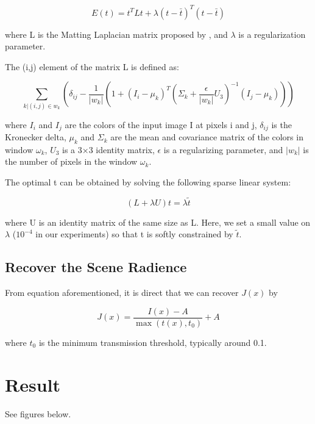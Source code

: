 \documentclass{article}
\begin{document}
        $$E(t) = t^{T} L t + \lambda (t - \bar{t})^{T} (t - \bar{t})$$

        where L is the Matting Laplacian matrix proposed by \cite{Anat}, and $\lambda$ is a regularization parameter.

        The (i,j) element of the matrix L is defined as:

        $$\sum_{k|(i, j) \in w_{k}} (\delta_{ij} - \frac{1}{|w_{k}|} (1 + (I_{i} - \mu_{k})^{T} (\Sigma_{k} + \frac{\epsilon}{|w_{k}|} U_{3})^{-1} (I_{j} - \mu_{k})))$$

        where $I_{i}$ and $I_{j}$ are the colors of the input image I at pixels i and j, $\delta_{ij}$ is the Kronecker delta, $\mu_{k}$ and $\Sigma_{k}$ are the mean and covariance matrix of the colors in window $\omega_{k}$, $U_{3}$ is a 3×3 identity matrix, $\epsilon$ is a regularizing parameter, and $|w_{k}|$ is the number of pixels in the window $\omega_{k}$.

        The optimal t can be obtained by solving the following sparse linear system:

        $$(L + \lambda U) t = \lambda \widetilde{t}$$

        where U is an identity matrix of the same size as L. Here, we set a small value on $\lambda$ ($10^{-4}$ in our experiments) so that t is softly constrained by $\widetilde{t}$.

    \subsection{Recover the Scene Radience}

        From equation aforementioned, it is direct that we can recover $J(x)$ by

        $$J(x) = \frac{I(x) - A}{\max(t(x), t_{0})} + A$$

        where $t_{0}$ is the minimum transmission threshold, typically around 0.1.

\section{Result}

    See figures below.
\end{document}
